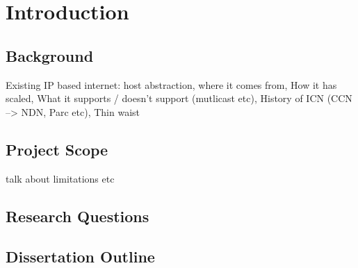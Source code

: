 \chapter{Introduction}
\section{Background}
Existing IP based internet: host abstraction, where it comes from, How it has scaled, What it supports / doesn't support (mutlicast etc), History of ICN (CCN --> NDN, Parc etc), Thin waist

\section{Project Scope}
talk about limitations etc

\section{Research Questions}

\section{Dissertation Outline}